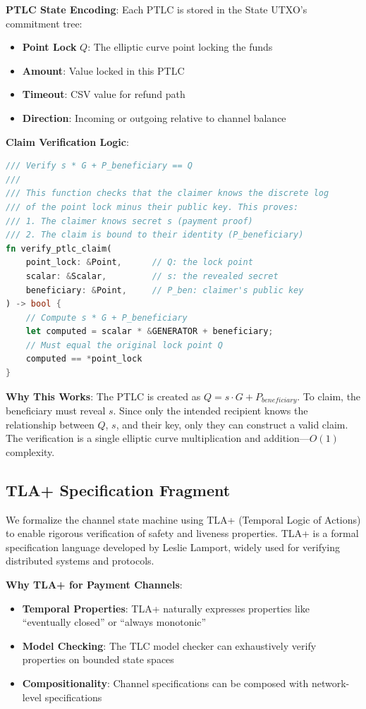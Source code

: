 \textbf{PTLC State Encoding}: Each PTLC is stored in the State UTXO's commitment tree:
\begin{itemize}
    \item \textbf{Point Lock} $Q$: The elliptic curve point locking the funds
    \item \textbf{Amount}: Value locked in this PTLC
    \item \textbf{Timeout}: CSV value for refund path
    \item \textbf{Direction}: Incoming or outgoing relative to channel balance
\end{itemize}

\textbf{Claim Verification Logic}:

\begin{lstlisting}[language=Rust, caption={PTLC Claim Verification Logic}, label={lst:ptlc_claim}]
/// Verify s * G + P_beneficiary == Q
/// 
/// This function checks that the claimer knows the discrete log
/// of the point lock minus their public key. This proves:
/// 1. The claimer knows secret s (payment proof)
/// 2. The claim is bound to their identity (P_beneficiary)
fn verify_ptlc_claim(
    point_lock: &Point,      // Q: the lock point
    scalar: &Scalar,         // s: the revealed secret
    beneficiary: &Point,     // P_ben: claimer's public key
) -> bool {
    // Compute s * G + P_beneficiary
    let computed = scalar * &GENERATOR + beneficiary;
    // Must equal the original lock point Q
    computed == *point_lock
}
\end{lstlisting}

\textbf{Why This Works}:
The PTLC is created as $Q = s \cdot G + P_{beneficiary}$. To claim, the beneficiary must reveal $s$. Since only the intended recipient knows the relationship between $Q$, $s$, and their key, only they can construct a valid claim. The verification is a single elliptic curve multiplication and addition---$O(1)$ complexity.

\subsection{TLA+ Specification Fragment}

We formalize the channel state machine using TLA+ (Temporal Logic of Actions) to enable rigorous verification of safety and liveness properties. TLA+ is a formal specification language developed by Leslie Lamport, widely used for verifying distributed systems and protocols.

\textbf{Why TLA+ for Payment Channels}:
\begin{itemize}
    \item \textbf{Temporal Properties}: TLA+ naturally expresses properties like ``eventually closed'' or ``always monotonic''
    \item \textbf{Model Checking}: The TLC model checker can exhaustively verify properties on bounded state spaces
    \item \textbf{Compositionality}: Channel specifications can be composed with network-level specifications
\end{itemize}

